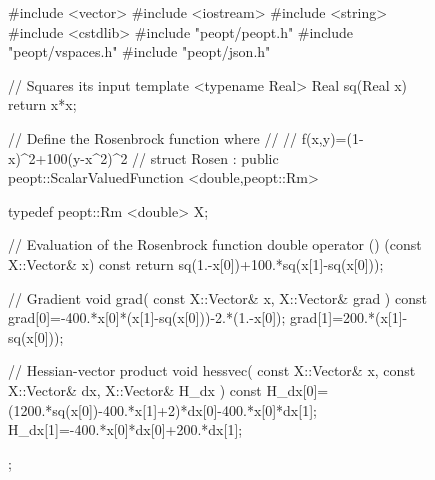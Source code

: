 \begin{figure}
    \begin{lstCpp}
#include <vector>
#include <iostream>
#include <string>
#include <cstdlib>
#include "peopt/peopt.h"
#include "peopt/vspaces.h"
#include "peopt/json.h"

// Squares its input
template <typename Real>
Real sq(Real x){
    return x*x;
}

// Define the Rosenbrock function where
// 
// f(x,y)=(1-x)^2+100(y-x^2)^2
//
struct Rosen
    : public peopt::ScalarValuedFunction <double,peopt::Rm>
{
    typedef peopt::Rm <double> X;

    // Evaluation of the Rosenbrock function
    double operator () (const X::Vector& x) const {
        return sq(1.-x[0])+100.*sq(x[1]-sq(x[0]));
    }

    // Gradient
    void grad(
        const X::Vector& x,
        X::Vector& grad
    ) const {
        grad[0]=-400.*x[0]*(x[1]-sq(x[0]))-2.*(1.-x[0]);
        grad[1]=200.*(x[1]-sq(x[0]));
    }

    // Hessian-vector product
    void hessvec(
        const X::Vector& x,
        const X::Vector& dx,
        X::Vector& H_dx
    ) const {
        H_dx[0]=(1200.*sq(x[0])-400.*x[1]+2)*dx[0]-400.*x[0]*dx[1];
        H_dx[1]=-400.*x[0]*dx[0]+200.*dx[1];
    }
};
\end{lstCpp}
\end{figure}
